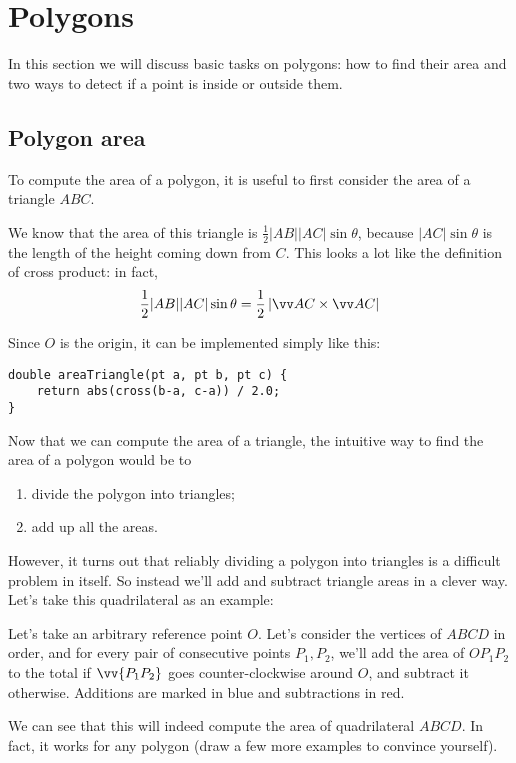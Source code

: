 \section{Polygons}
In this section we will discuss basic tasks on polygons: how to find their area and two ways to detect if a point is inside or outside them.

\subsection{Polygon area}\label{ss:polygon-area}
To compute the area of a polygon, it is useful to first consider the area of a triangle $ABC$.


We know that the area of this triangle is $\frac{1}{2} |AB| |AC| \sin\theta$, because $|AC| \sin\theta$ is the length of the height coming down from $C$. This looks a lot like the definition of cross product: in fact,
\[\frac{1}{2} |AB| |AC| \sin\theta = \frac{1}{2} \left|\crossv{AC}{AC}\right|\]

Since $O$ is the origin, it can be implemented simply like this:
\begin{lstlisting}
double areaTriangle(pt a, pt b, pt c) {
    return abs(cross(b-a, c-a)) / 2.0;
}
\end{lstlisting}

Now that we can compute the area of a triangle, the intuitive way to find the area of a polygon would be to
\begin{enumerate}
\item divide the polygon into triangles;
\item add up all the areas.
\end{enumerate}

However, it turns out that reliably dividing a polygon into triangles is a difficult problem in itself. So instead we'll add and subtract triangle areas in a clever way. Let's take this quadrilateral as an example:

Let's take an arbitrary reference point $O$. Let's consider the vertices of $ABCD$ in order, and for every pair of consecutive points $P_1,P_2$, we'll add the area of $OP_1P_2$ to the total if $\vv{P_1P_2}$ goes counter-clockwise around $O$, and subtract it otherwise. Additions are marked in blue and subtractions in red.

We can see that this will indeed compute the area of quadrilateral $ABCD$. In fact, it works for any polygon (draw a few more examples to convince yourself).

